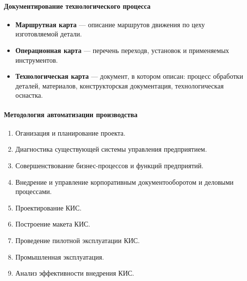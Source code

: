 \begin{figure}[htpb]
  \centering
\end{figure}

\paragraph{Документирование технологического процесса}
\begin{itemize} 
  \item \textbf{Маршрутная карта} --- описание маршрутов движения
    по цеху изготовляемой детали.
  \item \textbf{Операционная карта} --- перечень переходв, установок и применяемых
    инструментов.
  \item \textbf{Технологическая карта} --- документ, в котором описан: процесс
    обработки деталей, материалов, конструкторская документация, технологическая
    оснастка.
\end{itemize}

\paragraph{Методология автоматизации производства}
\begin{enumerate}
  \item Оганизация и планирование проекта.
  \item Диагностика существующей системы управления предприятием.
  \item Совершенствование бизнес-процессов и функций предприятий.
  \item Внедрение и управление корпоративным документооборотом и деловыми
    процессами.
  \item Проектирование КИС.
  \item Построение макета КИС.
  \item Проведение пилотной эксплуатации КИС.
  \item Промышленная эксплуатация.
  \item Анализ эффективности внедрения КИС.
\end{enumerate}
